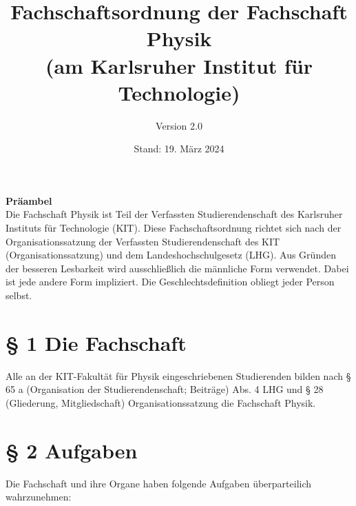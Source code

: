 \documentclass[a4paper, parskip=half, numbers=noenddot]{scrartcl}
\title{Fachschaftsordnung der Fachschaft Physik\\(am Karlsruher Institut für Technologie)}
\author{Version 2.0}
\date{Stand: 19. März 2024}
\begin{document}
%
%

\maketitle
\thispagestyle{empty}
\vspace{15cm}
%
%
{\bfseries Präambel}\\
Die Fachschaft Physik ist Teil der Verfassten Studierendenschaft des Karlsruher Instituts für Technologie (KIT). Diese Fachschaftsordnung richtet sich nach der Organisationssatzung der Verfassten Studierendenschaft des KIT (Organisationssatzung) und dem Landeshochschulgesetz (LHG). Aus Gründen der besseren Lesbarkeit wird ausschließlich die männliche Form verwendet. Dabei ist jede andere Form impliziert. Die Geschlechtsdefinition obliegt jeder Person selbst.

\pagestyle{empty}
\newpage
\rule{0mm}{0mm}
\newpage



\setcounter{page}{1}
\pagestyle{plain}


%
%




%
%

\section*{§ 1 Die Fachschaft}
Alle an der KIT-Fakultät für Physik eingeschriebenen Studierenden bilden nach § 65 a (Organisation der Studierendenschaft; Beiträge) Abs. 4 LHG und § 28 (Gliederung, Mitgliedschaft) Organisationssatzung die Fachschaft Physik.


%
%

\section*{§ 2 Aufgaben}

Die Fachschaft und ihre Organe haben folgende Aufgaben überparteilich wahrzunehmen:
\end{document}
